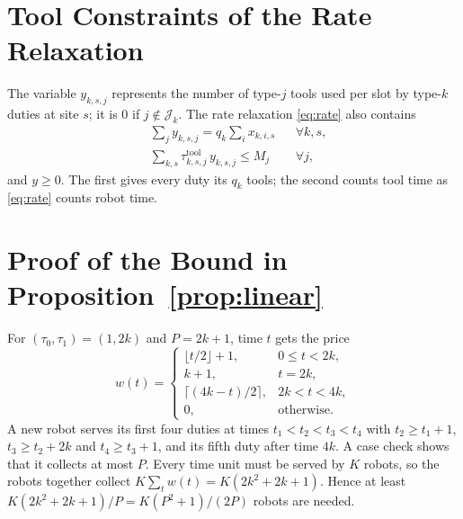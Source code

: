 \section{Tool Constraints of the Rate Relaxation}
\label{app:tools}

The variable $y_{k,s,j}$ represents the number of type-$j$ tools used per slot by type-$k$ duties at site $s$; it is $0$ if $j \notin \mathcal{J}_k$.
The rate relaxation \eqref{eq:rate} also contains
\begin{equation*}
\begin{aligned}
  & \textstyle\sum_{j} y_{k,s,j} = q_k \sum_i x_{k,i,s} && \forall k, s,\\
  & \textstyle\sum_{k,s} \tau^{\mathrm{tool}}_{k,s,j}\, y_{k,s,j} \le M_j && \forall j,
\end{aligned}
\end{equation*}
and $y \ge 0$.
The first gives every duty its $q_k$ tools; the second counts tool time as \eqref{eq:rate} counts robot time.

\section{Proof of the Bound in Proposition~\ref{prop:linear}}
\label{app:linear}

For $(\tau_0, \tau_1) = (1, 2k)$ and $P = 2k+1$, time $t$ gets the price
\begin{equation*}
  w(t) =
  \begin{cases}
    \lfloor t/2 \rfloor + 1, & 0 \le t < 2k,\\
    k + 1, & t = 2k,\\
    \lceil (4k - t)/2 \rceil, & 2k < t < 4k,\\
    0, & \text{otherwise.}
  \end{cases}
\end{equation*}
A new robot serves its first four duties at times $t_1 < t_2 < t_3 < t_4$ with $t_2 \ge t_1 + 1$, $t_3 \ge t_2 + 2k$ and $t_4 \ge t_3 + 1$, and its fifth duty after time $4k$.
A case check shows that it collects at most $P$.
Every time unit must be served by $K$ robots, so the robots together collect $K \sum_t w(t) = K(2k^2 + 2k + 1)$.
Hence at least $K(2k^2+2k+1)/P = K(P^2+1)/(2P)$ robots are needed.

